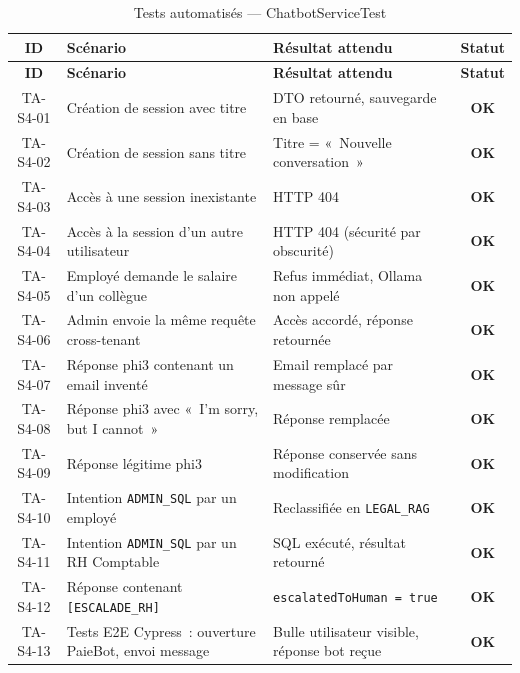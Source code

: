 \renewcommand{\arraystretch}{1.2}
\begin{small}
\begin{longtable}{|c|p{5.5cm}|p{3.8cm}|c|}
\hline
\rowcolor[gray]{0.9}
\textbf{ID} & \textbf{Scénario} & \textbf{Résultat attendu} & \textbf{Statut} \\ \hline
\endfirsthead \hline
\rowcolor[gray]{0.9}
\textbf{ID} & \textbf{Scénario} & \textbf{Résultat attendu} & \textbf{Statut} \\ \hline
\endhead \hline \endfoot \hline
\caption{Tests automatisés --- ChatbotServiceTest}\label{tab:auto-chatbot}\endlastfoot
TA-S4-01 & Création de session avec titre
    & DTO retourné, sauvegarde en base & \textcolor{green!60!black}{\textbf{OK}} \\ \hline
TA-S4-02 & Création de session sans titre
    & Titre = «~Nouvelle conversation~» & \textcolor{green!60!black}{\textbf{OK}} \\ \hline
TA-S4-03 & Accès à une session inexistante
    & HTTP 404 & \textcolor{green!60!black}{\textbf{OK}} \\ \hline
TA-S4-04 & Accès à la session d'un autre utilisateur
    & HTTP 404 (sécurité par obscurité) & \textcolor{green!60!black}{\textbf{OK}} \\ \hline
TA-S4-05 & Employé demande le salaire d'un collègue
    & Refus immédiat, Ollama non appelé & \textcolor{green!60!black}{\textbf{OK}} \\ \hline
TA-S4-06 & Admin envoie la même requête cross-tenant
    & Accès accordé, réponse retournée & \textcolor{green!60!black}{\textbf{OK}} \\ \hline
TA-S4-07 & Réponse phi3 contenant un email inventé
    & Email remplacé par message sûr & \textcolor{green!60!black}{\textbf{OK}} \\ \hline
TA-S4-08 & Réponse phi3 avec «~I'm sorry, but I cannot~»
    & Réponse remplacée & \textcolor{green!60!black}{\textbf{OK}} \\ \hline
TA-S4-09 & Réponse légitime phi3
    & Réponse conservée sans modification & \textcolor{green!60!black}{\textbf{OK}} \\ \hline
TA-S4-10 & Intention \texttt{ADMIN\_SQL} par un employé
    & Reclassifiée en \texttt{LEGAL\_RAG} & \textcolor{green!60!black}{\textbf{OK}} \\ \hline
TA-S4-11 & Intention \texttt{ADMIN\_SQL} par un RH Comptable
    & SQL exécuté, résultat retourné & \textcolor{green!60!black}{\textbf{OK}} \\ \hline
TA-S4-12 & Réponse contenant \texttt{[ESCALADE\_RH]}
    & \texttt{escalatedToHuman = true} & \textcolor{green!60!black}{\textbf{OK}} \\ \hline
TA-S4-13 & Tests E2E Cypress~: ouverture PaieBot, envoi message
    & Bulle utilisateur visible, réponse bot reçue & \textcolor{green!60!black}{\textbf{OK}} \\ \hline
\end{longtable}
\end{small}
\renewcommand{\arraystretch}{1.0}

